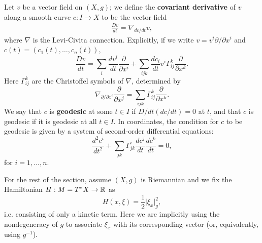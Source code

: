 \documentclass{amsart}
\begin{document}
\begin{definition}
    Let $v$ be a vector field on $(X,g)$; we define the \textbf{covariant derivative} of $v$
    along a smooth curve $c:I\to X$ to be the vector field
    \begin{align*}
        \frac{Dv}{dt} = \nabla_{dc/dt}v,
    \end{align*}
    where $\nabla$ is the Levi-Civita connection. Explicitly, if we write $v=v^i\partial/\partial x^i$
    and $c(t)=(c_1(t),\ldots,c_n(t))$,
    \begin{equation*}
        \frac{Dv}{dt} = \sum_i \frac{dv^i}{dt}\frac{\partial}{\partial x^i} + \sum_{ijk}\frac{dc_i}{dt}v^i\Gamma_{ij}^k\frac{\partial}{\partial x^k}.
    \end{equation*}
    Here $\Gamma_{ij}^k$ are the Christoffel symbols of $\nabla$, determined by
    \begin{equation*}
        \nabla_{\partial/\partial x^i}\frac{\partial}{\partial x^j}=\sum_{ijk}\Gamma^k_{ij}\frac{\partial}{\partial x^k}.
    \end{equation*}
    We say that $c$ is \textbf{geodesic} at some $t\in I$ if $D/dt(dc/dt)=0$ at $t$,
    and that $c$ is geodesic if it is geodesic at all $t\in I$. In coordinates, the condition
    for $c$ to be geodesic is given by a system of second-order differential equations:
    \begin{equation*}
        \frac{d^2 c^i}{dt^2} + \sum_{jk}\Gamma_{jk}^i\frac{dc^j}{dt}\frac{dc^k}{dt}=0,
    \end{equation*}
    for $i=1,\ldots, n.$
\end{definition}

For the rest of the section, assume $(X,g)$ is Riemannian and we fix the Hamiltonian $H:M=T^*X\to\mathbb{R}$ as
\begin{equation*}
    H(x,\xi)=\frac{1}{2}\big|\xi_x\big|^2_g,
\end{equation*}
i.e. consisting of only a kinetic term. Here we are implicitly using the nondegeneracy of $g$
to associate $\xi_x$ with its corresponding vector (or, equivalently, using $g^{-1}$).
\end{document}

